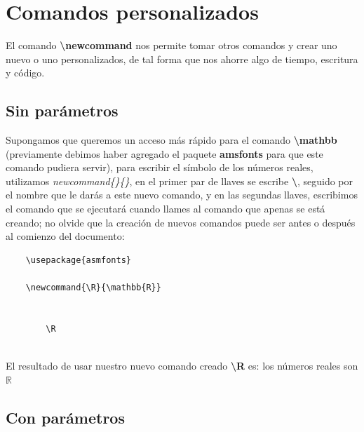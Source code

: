 \section{Comandos personalizados}

El comando \textbf{\textbackslash{newcommand}} nos permite tomar otros comandos y crear uno nuevo o uno personalizados, de tal forma que nos ahorre algo de tiempo, escritura y código.


\subsection{Sin parámetros}

Supongamos que queremos un acceso más rápido para el comando \textbf{\textbackslash{mathbb}} (previamente debimos haber agregado el paquete \textbf{amsfonts} para que este comando pudiera servir), para escribir el símbolo de los números reales, utilizamos \textit{newcommand\{\}\{\}}, en el primer par de llaves se escribe \textbf{\textbackslash}, seguido por el nombre que le darás a este nuevo comando, y en las segundas llaves, escribimos el comando que se ejecutará cuando llames al comando que apenas se está creando; no olvide que la creación de nuevos comandos puede ser antes o después al comienzo del documento:
\begin{lstlisting}
    \usepackage{asmfonts}
    
    \newcommand{\R}{\mathbb{R}}
    
    
        \R
    
\end{lstlisting}

\newcommand{\R}{\mathbb{R}}

El resultado de usar nuestro nuevo comando creado \textbf{\textbackslash{R}} es: los números reales son $\R$


\subsection{Con parámetros}

